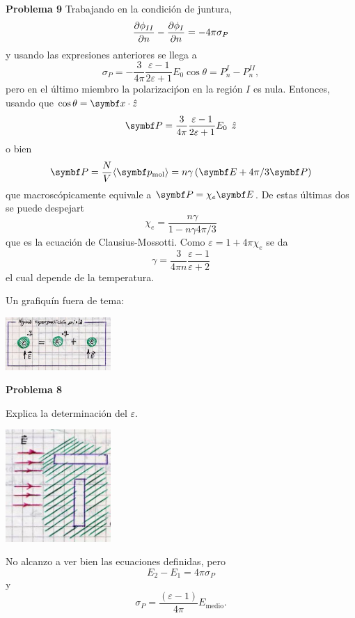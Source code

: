 \documentclass[10pt,oneside]{CBFT_book}
\begin{document}
\begin{ejemplo}{\bf Problema 9}
Trabajando en la condición de juntura,
\[
	\frac{\partial^{\hspace{-0.05em}} {\phi_{II}}}{\partial {n}^{\hspace{-0.05em}}} - \frac{\partial^{\hspace{-0.05em}} {\phi_{I}}}{\partial {n}^{\hspace{-0.05em}}} = - 4 \pi \sigma_P
\]
y usando las expresiones anteriores se llega a 
\[
	\sigma_P = - \frac{3}{4\pi} \frac{\varepsilon-1}{2\varepsilon +1} 
	E_0 \cos\theta = P_n^I - P_n^{II},
\]
pero en el último miembro la polarizaciṕon en la región $I$ es nula.
Entonces, usando que $\cos\theta = \vbx\cdot\hat{z}$
\[
	\vb{P} =  \frac{3}{4\pi} \frac{\varepsilon-1}{2\varepsilon+1}
	E_0 \: \zver
\]
o bien
\[
	\vb{P} = \frac{N}{V} \langle \vb{p}_{\text{mol}}\rangle =
	n \gamma \left( \vb{E} + 4\pi/3 \vb{P} \right)
\]
que macroscópicamente equivale a $\vb{P} = \chi_e \vb{E} $. De estas últimas
dos se puede despejart
\[
	\chi_e = \frac{ n \gamma }{1 - n \gamma 4 \pi / 3 }
\]
que es la ecuación de Clausius-Mossotti.
Como $ \varepsilon = 1 + 4\pi \chi_e$ se da 
\[
	\gamma = \frac{3}{4\pi n} \frac{\varepsilon-1}{\varepsilon+2}
\]
el cual depende de la temperatura.

Un grafiquín fuera de tema:

\includegraphics[width=0.3\textwidth]{images/fig_ft1_problema9E_medios.jpg}

\end{ejemplo}

\begin{ejemplo}{\bf Problema 8}
 
 
Explica la determinación del $\varepsilon$.

\includegraphics[width=0.3\textwidth]{images/fig_ft1_problema8_medios.jpg}


No alcanzo a ver bien las ecuaciones definidas, pero 	
\[
	E_2 - E_1 = 4 \pi \sigma_P
\]
y
\[
	\sigma_P = \frac{(\varepsilon - 1 )}{4\pi} E_{\text{medio}} .
\]
 
\end{ejemplo}

\end{document}

